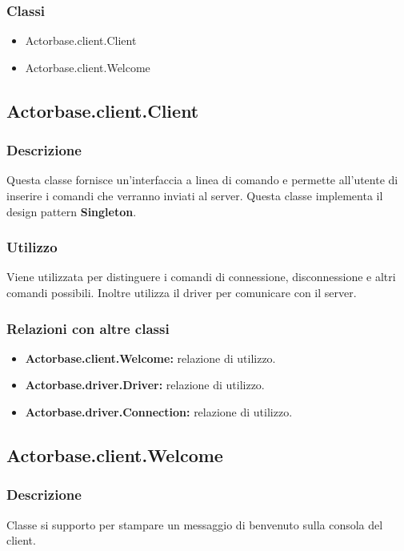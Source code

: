 \documentclass[a4paper]{article}
\begin{document}
			\subsubsection{Classi}
				\begin{itemize}
					\item Actorbase.client.Client
					\item Actorbase.client.Welcome
				\end{itemize}
				
		\subsection{Actorbase.client.Client}
			\subsubsection{Descrizione}
				Questa classe fornisce un'interfaccia a linea di comando e permette all'utente di inserire i comandi che verranno inviati al server. 
				Questa classe implementa il design pattern \textbf{Singleton}.
				
			\subsubsection{Utilizzo}
				Viene utilizzata per distinguere i comandi di connessione, disconnessione e altri comandi possibili. Inoltre utilizza il driver per comunicare 
				con il server.
				
			\subsubsection{Relazioni con altre classi}
				\begin{itemize}
					\item \textbf{Actorbase.client.Welcome:} relazione di utilizzo.
					\item \textbf{Actorbase.driver.Driver:} relazione di utilizzo.
					\item \textbf{Actorbase.driver.Connection:} relazione di utilizzo.
				\end{itemize}
		
		\subsection{Actorbase.client.Welcome}
			\subsubsection{Descrizione}
				Classe si supporto per stampare un messaggio di benvenuto sulla consola del client.
				
\end{document}
